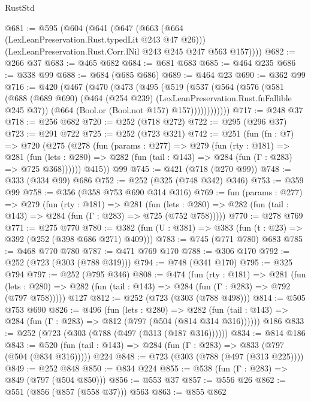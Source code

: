 \begin{lexlean}{RustStd}
\begin{coremodule}
@681 := @595
    (@604
      (@641
        (@647
          (@663 (@664 (LexLeanPreservation.Rust.typedLit @243 @47 @26)))
          (LexLeanPreservation.Rust.Corr.lNil @243 @245 @247 @563 @157))))
@682 := @266 @37
@683 := @465 @682
@684 := @681 @683
@685 := @464 @235
@686 := @338 @99
@688 := @684 (@685 @686)
@689 := @464 @23
@690 := @362 @99
@716 := @420
    (@467
      (@470
        (@473
          (@495
            (@519
              (@537
                (@564
                  (@576
                    (@581
                      (@688
                        (@689 @690)
                        (@464 (@254 @239) (LexLeanPreservation.Rust.fnFallible @245 @37))
                        (@664 (Bool.or (Bool.not @157) @157))))))))))))
@717 := @248 @37
@718 := @256 @682
@720 := @252 (@718 @272)
@722 := @295 (@296 @37)
@723 := @291 @722
@725 := @252 (@723 @321)
@742 := @251
    (fun (fn : @7) =>
    @720
      (@275
        (@278
          (fun (params : @277) =>
          @279
            (fun (rty : @181) =>
            @281
              (fun (lets : @280) =>
              @282 (fun (tail : @143) => @284 (fun (Γ : @283) => @725 @368))))))
        @415))
    @99
@745 := @421 (@718 (@270 @99))
@748 := @333 (@334 @99) @686
@752 := @252 (@325 (@748 @342) @346)
@753 := @359 @99
@758 := @356 (@358 @753 @690 @314 @316)
@769 := fun (params : @277) =>
  @279
    (fun (rty : @181) =>
    @281
      (fun (lets : @280) => @282 (fun (tail : @143) => @284 (fun (Γ : @283) => @725 (@752 @758)))))
@770 := @278 @769
@771 := @275 @770
@780 := @382 (fun (U : @381) => @383 (fun (t : @23) => @392 (@252 (@398 @686 @271) @409)))
@783 := @745 (@771 @780) @683
@785 := @468 @770 @780
@787 := @471 @769 @170
@788 := @306 @170
@792 := @252 (@723 (@303 (@788 @319)))
@794 := @748 (@341 @170)
@795 := @325 @794
@797 := @252 (@795 @346)
@808 := @474
    (fun (rty : @181) =>
    @281
      (fun (lets : @280) => @282 (fun (tail : @143) => @284 (fun (Γ : @283) => @792 (@797 @758)))))
    @127
@812 := @252 (@723 (@303 (@788 @498)))
@814 := @505 @753 @690
@826 := @496
    (fun (lets : @280) =>
    @282 (fun (tail : @143) => @284 (fun (Γ : @283) => @812 (@797 (@504 (@814 @314 @316))))))
    @186
@833 := @252 (@723 (@303 (@788 (@497 (@313 (@187 @316))))))
@834 := @814 @186
@843 := @520 (fun (tail : @143) => @284 (fun (Γ : @283) => @833 (@797 (@504 (@834 @316))))) @224
@848 := @723 (@303 (@788 (@497 (@313 @225))))
@849 := @252 @848
@850 := @834 @224
@855 := @538 (fun (Γ : @283) => @849 (@797 (@504 @850)))
@856 := @553 @37
@857 := @556 @26
@862 := @551 (@856 (@857 (@558 @37))) @563
@863 := @855 @862

\end{coremodule}
\end{lexlean}
